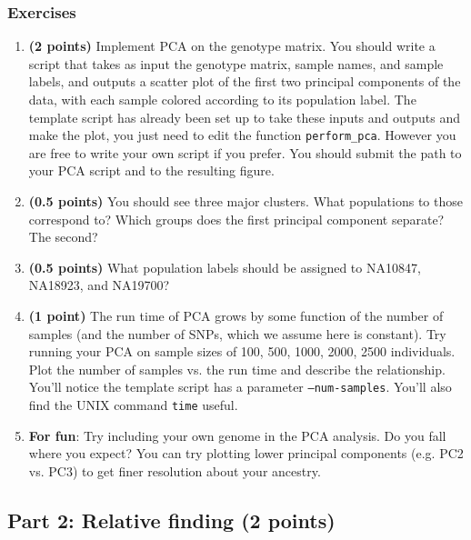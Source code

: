 \documentclass[12pt]{article}
\begin{document}
\subsubsection*{Exercises}
\begin{enumerate}
\item \textbf{(2 points)}
Implement PCA on the genotype matrix. You should write a script that takes as input the genotype matrix, sample names, and sample labels, and outputs a scatter plot of the first two principal components of the data, with each sample colored according to its population label. The template script has already been set up to take these inputs and outputs and make the plot, you just need to edit the function \texttt{perform\_pca}. However you are free to write your own script if you prefer. You should submit the path to your PCA script and to the resulting figure.

\item \textbf{(0.5 points)}
You should see three major clusters. What populations to those correspond to? Which groups does the first principal component separate? The second?

\item \textbf{(0.5 points)}
What population labels should be assigned to NA10847, NA18923, and NA19700?

\item \textbf{(1 point)}
The run time of PCA grows by some function of the number of samples (and the number of SNPs, which we assume here is constant). Try running your PCA on sample sizes of 100, 500, 1000, 2000, 2500 individuals. Plot the number of samples vs. the run time and describe the relationship. You'll notice the template script has a parameter \texttt{--num-samples}. You'll also find the UNIX command \texttt{time} useful.

\item \textbf{For fun}: Try including your own genome in the PCA analysis. Do you fall where you expect? You can try plotting lower principal components (e.g. PC2 vs. PC3) to get finer resolution about your ancestry. 

\end{enumerate}


\subsection*{Part 2: Relative finding (2 points)}
\end{document}
